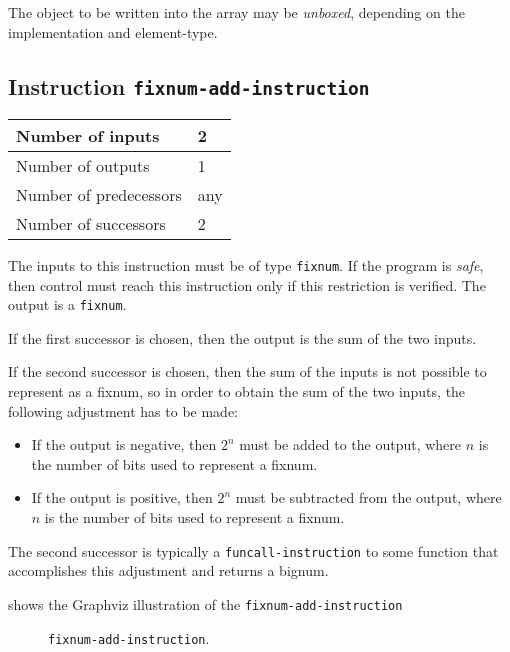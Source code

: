 The object to be written into the array may be \emph{unboxed}, depending
on the implementation and element-type.

\subsection{Instruction \texttt{fixnum-add-instruction}}
\label{mir-instruction-fixnum-add}

\begin{tabular}{|l|l|}
\hline
Number of inputs & 2\\
\hline
Number of outputs & 1\\
\hline
Number of predecessors & any\\
\hline
Number of successors & 2\\
\hline
\end{tabular}

The inputs to this instruction must be of type \texttt{fixnum}.  If
the program is \emph{safe}, then control must reach this instruction
only if this restriction is verified.  The output is a
\texttt{fixnum}.

If the first successor is chosen, then the output is the sum of the
two inputs.

If the second successor is chosen, then the sum of the inputs is not
possible to represent as a fixnum, so in order to obtain the sum of
the two inputs, the following adjustment has to be made:

\begin{itemize}
\item If the output is negative, then $2^n$ must be added to the
  output, where $n$ is the number of bits used to represent a fixnum. 
\item If the output is positive, then $2^n$ must be subtracted from
  the output, where $n$ is the number of bits used to represent a
  fixnum.
\end{itemize}

The second successor is typically a \texttt{funcall-instruction} to
some function that accomplishes this adjustment and returns a bignum.

 shows the Graphviz illustration of the
\texttt{fixnum-add-instruction}

\begin{figure}
\begin{center}
\end{center}
\caption{\label{fig-fixnum-add-instruction}
\texttt{fixnum-add-instruction}.}
\end{figure}

